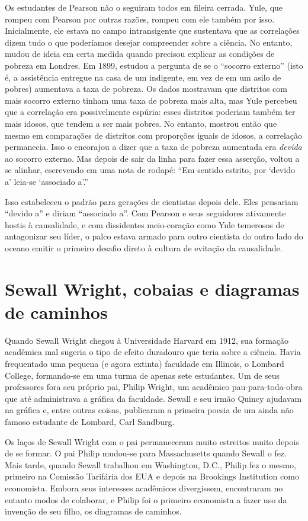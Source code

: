 \documentclass[11pt,a5paper,twoside]{book}
\begin{document}
Os estudantes de Pearson não o seguiram todos em fileira cerrada. Yule, que rompeu com Pearson por outras razões, rompeu com ele também por isso. Inicialmente, ele estava no campo intransigente que sustentava que as correlações dizem tudo o que poderíamos desejar compreender sobre a ciência. No entanto, mudou de ideia em certa medida quando precisou explicar as condições de pobreza em Londres. Em 1899, estudou a pergunta de se o “socorro externo” (isto é, a assistência entregue na casa de um indigente, em vez de em um asilo de pobres) aumentava a taxa de pobreza. Os dados mostravam que distritos com mais socorro externo tinham uma taxa de pobreza mais alta, mas Yule percebeu que a correlação era possivelmente espúria: esses distritos poderiam também ter mais idosos, que tendem a ser mais pobres. No entanto, mostrou então que mesmo em comparações de distritos com proporções iguais de idosos, a correlação permanecia. Isso o encorajou a dizer que a taxa de pobreza aumentada era \textit{devida} ao socorro externo. Mas depois de sair da linha para fazer essa asserção, voltou a se alinhar, escrevendo em uma nota de rodapé: “Em sentido estrito, por ‘devido a’ leia-se ‘associado a’.”

Isso estabeleceu o padrão para gerações de cientistas depois dele. Eles pensariam “devido a” e diriam “associado a”. Com Pearson e seus seguidores ativamente hostis à causalidade, e com dissidentes meio-coração como Yule temerosos de antagonizar seu líder, o palco estava armado para outro cientista do outro lado do oceano emitir o primeiro desafio direto à cultura de evitação da causalidade.

\section{Sewall Wright, cobaias e diagramas de caminhos}
Quando Sewall Wright chegou à Universidade Harvard em 1912, sua formação acadêmica mal sugeria o tipo de efeito duradouro que teria sobre a ciência. Havia frequentado uma pequena (e agora extinta) faculdade em Illinois, o Lombard College, formando-se em uma turma de apenas sete estudantes. Um de seus professores fora seu próprio pai, Philip Wright, um acadêmico pau-para-toda-obra que até administrava a gráfica da faculdade. Sewall e seu irmão Quincy ajudavam na gráfica e, entre outras coisas, publicaram a primeira poesia de um ainda não famoso estudante de Lombard, Carl Sandburg.

Os laços de Sewall Wright com o pai permaneceram muito estreitos muito depois de se formar. O pai Philip mudou-se para Massachusetts quando Sewall o fez. Mais tarde, quando Sewall trabalhou em Washington, D.C., Philip fez o mesmo, primeiro na Comissão Tarifária dos EUA e depois na Brookings Institution como economista. Embora seus interesses acadêmicos divergissem, encontraram no entanto modos de colaborar, e Philip foi o primeiro economista a fazer uso da invenção de seu filho, os diagramas de caminhos.
\end{document}
